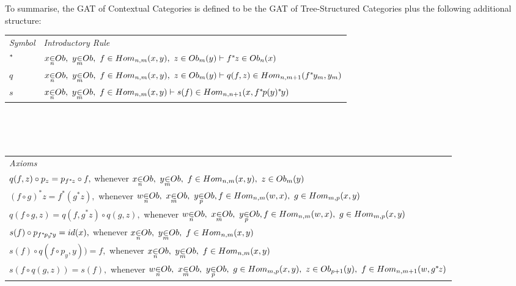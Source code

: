 \documentclass[10pt,a4paper]{scrartcl}
\newcommand{\ssub}{\kern-2pt^*\kern-1pt}
\renewcommand{\sub}{^*\kern-1pt}
\begin{document}
\noindent To summarise, the GAT of Contextual Categories is defined to be the GAT of Tree-Structured Categories plus
the following additional structure: \\
\vspace{0.1cm} 
\begin{tabular}{>{\itshape}l l}
Symbol & \itshape{Introductory Rule} \\[0.1cm]
$\sub $&$ \ofObi{x}{n} ,\  \ofObi{y}{m} ,\  \ofHomij{f}{n}{m}{x}{y} ,\  \ofT{z}{\Obi{m}(y)}
\tstyle \ofT {f \sub z}{\Obi{n}(x) } $\\[0.25cm]
$ q  $&$ \ofObi{x}{n} ,\  \ofObi{y}{m} ,\  \ofHomij{f}{n}{m}{x}{y} ,\  \ofT{z}{\Obi{m}(y)}
\tstyle
                     \ofT{q(f,z)}{  \Homij{n}{m+1}(f\sub y_m  , y_m ) }$  \\ [0.25cm]
$ s  $ & $ \ofObi{x}{n} ,\  \ofObi{y}{m} ,\  \ofHomij{f}{n}{m}{x}{y} \tstyle
                 \ofT{s(f)} {\Homij{n}{n+1}(x,f \sub p (y)  \sub y)} $ \\ [0.25cm]


\end{tabular} \\
\vspace{.1cm}  \\
\vspace{.03cm} \\
\begin{tabular}{l}
\itshape{Axioms} \\
$q(f,z) \circ p_z =p_{f\sub z} \circ f,$ 
          whenever $\ofObi{x}{n} ,\  \ofObi{y}{m} ,\  \ofHomij{f}{n}{m}{x}{y} ,\  \ofT{z}{\Obi{m}(y)} $\\  [0.25cm]
					

$(f \circ g)^*z =  f^* (g ^* z), $
          whenever  $ \ofObi{w}{n} ,\ \ofObi{x}{m} ,\ \ofObi{y}{p}, 
					\ofHomij{f}{n}{m}{w}{x} ,\  \ofHomij{g}{m}{p}{x}{y}    $ \\[0.25cm]

$q(f \circ g,z) = q(f,g^*z) \circ q(g,z), $
				   whenever  $ \ofObi{w}{n} ,\ \ofObi{x}{m} ,\ \ofObi{y}{p}, 
					\ofHomij{f}{n}{m}{w}{x} ,\  \ofHomij{g}{m}{p}{x}{y}    $ \\[0.25cm]
					
$s(f) \circ p_{f \sub {p_y} \ssub y} = id(x),$ 
          whenever $\ofObi{x}{n} ,\  \ofObi{y}{m} ,\  \ofHomij{f}{n}{m}{x}{y} $ \\ [0.25cm]
				
$s(f) \circ q( f \circ p_y    ,y))=f, $	
          whenever	$ \ofObi{x}{n} ,\  \ofObi{y}{m} ,\  \ofHomij{f}{n}{m}{x}{y} $ \\ [0.25cm]		
					
$s(f \circ q(g,z))=s(f),$ 
          whenever $\ofObi{w}{n} ,\  \ofObi{x}{m}  ,\   \ofObi{y}{p} ,\    \ofHomij{g}{m}{p}{x}{y} ,\ \ofT{z}{\Obi{p+1}(y)} ,\ \ofHomij{f}{n}{m+1}{w}{g \sub z} $ \\ [0.25cm]				
					
\end{tabular}  \\
\end{document}
